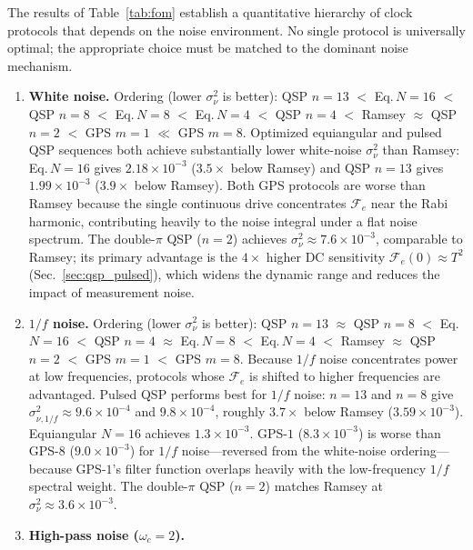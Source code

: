 \documentclass[aps,pra,twocolumn,superscriptaddress,longbibliography]{revtex4-2}
\begin{document}
The results of Table~\ref{tab:fom} establish a quantitative hierarchy of clock
protocols that depends on the noise environment.
No single protocol is universally optimal; the appropriate choice must be
matched to the dominant noise mechanism.
\begin{enumerate}
  \item \textbf{White noise.}
        Ordering (lower $\sigma^2_\nu$ is better):
        QSP $n{=}13$ $<$ Eq.\,$N{=}16$ $<$ QSP $n{=}8$ $<$ Eq.\,$N{=}8$
        $<$ Eq.\,$N{=}4$ $<$ QSP $n{=}4$ $<$ Ramsey $\approx$ QSP $n{=}2$
        $<$ GPS $m{=}1$ $\ll$ GPS $m{=}8$.
        Optimized equiangular and pulsed QSP sequences both achieve substantially
        lower white-noise $\sigma^2_\nu$ than Ramsey: Eq.\,$N{=}16$ gives
        $2.18\times10^{-3}$ ($3.5\times$ below Ramsey) and QSP $n{=}13$ gives
        $1.99\times10^{-3}$ ($3.9\times$ below Ramsey).
        Both GPS protocols are worse than Ramsey because the single continuous
        drive concentrates $\mathcal{F}_e$ near the Rabi harmonic, contributing
        heavily to the noise integral under a flat noise spectrum.
        The double-$\pi$ QSP ($n{=}2$) achieves $\sigma^2_\nu\approx7.6\times10^{-3}$,
        comparable to Ramsey; its primary advantage is the $4\times$ higher
        DC sensitivity $\mathcal{F}_e(0)\approx T^2$ (Sec.~\ref{sec:qsp_pulsed}),
        which widens the dynamic range and reduces the impact of measurement noise.
  \item \textbf{$1/f$ noise.}
        Ordering (lower $\sigma^2_\nu$ is better):
        QSP $n{=}13$ $\approx$ QSP $n{=}8$ $<$ Eq.\,$N{=}16$ $<$ QSP $n{=}4$
        $\approx$ Eq.\,$N{=}8$ $<$ Eq.\,$N{=}4$ $<$ Ramsey $\approx$ QSP $n{=}2$
        $<$ GPS $m{=}1$ $<$ GPS $m{=}8$.
        Because $1/f$ noise concentrates power at low frequencies, protocols
        whose $\mathcal{F}_e$ is shifted to higher frequencies are advantaged.
        Pulsed QSP performs best for $1/f$ noise: $n{=}13$ and $n{=}8$ give
        $\sigma^2_{\nu,1/f}\approx9.6\times10^{-4}$ and $9.8\times10^{-4}$,
        roughly $3.7\times$ below Ramsey ($3.59\times10^{-3}$).
        Equiangular $N{=}16$ achieves $1.3\times10^{-3}$.
        GPS-$1$ ($8.3\times10^{-3}$) is worse than GPS-$8$ ($9.0\times10^{-3}$)
        for $1/f$ noise---reversed from the white-noise ordering---because GPS-$1$'s
        filter function overlaps heavily with the low-frequency $1/f$ spectral weight.
        The double-$\pi$ QSP ($n{=}2$) matches Ramsey at $\sigma^2_\nu\approx3.6\times10^{-3}$.
  \item \textbf{High-pass noise ($\omega_c=2$).}

\end{enumerate}
\end{document}
